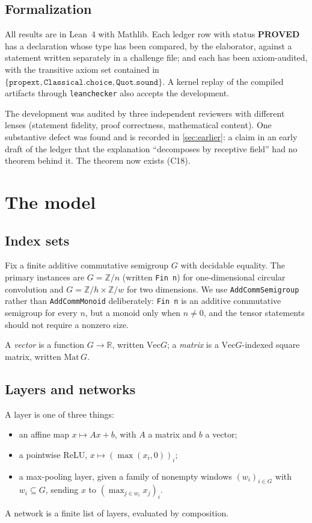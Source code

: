 \documentclass[11pt]{article}
\newcommand{\Lean}{Lean}
\newcommand{\code}[1]{\texttt{#1}}
\newcommand{\claim}[1]{\textbf{#1}}
\newcommand{\RR}{\mathbb{R}}
\newcommand{\VecG}{\mathrm{Vec}}
\begin{document}
\subsection{Formalization}

All results are in \Lean{}~4 with Mathlib. Each ledger row with status
\claim{PROVED} has a declaration whose type has been compared, by the
elaborator, against a statement written separately in a challenge file; and
each has been axiom-audited, with the transitive axiom set contained in
$\{\code{propext}, \code{Classical.choice}, \code{Quot.sound}\}$. A kernel
replay of the compiled artifacts through \code{leanchecker} also accepts the
development.

The development was audited by three independent reviewers with different
lenses (statement fidelity, proof correctness, mathematical content). One
substantive defect was found and is recorded in \cref{sec:earlier}: a claim in
an early draft of the ledger that the explanation ``decomposes by receptive
field'' had no theorem behind it. The theorem now exists (C18).

\section{The model}

\subsection{Index sets}

Fix a finite additive commutative semigroup $G$ with decidable equality. The
primary instances are $G = \mathbb{Z}/n$ (written \code{Fin n}) for
one-dimensional circular convolution and $G = \mathbb{Z}/h \times \mathbb{Z}/w$
for two dimensions. We use \code{AddCommSemigroup} rather than
\code{AddCommMonoid} deliberately: \code{Fin n} is an additive commutative
semigroup for every $n$, but a monoid only when $n \ne 0$, and the tensor
statements should not require a nonzero size.

A \emph{vector} is a function $G \to \RR$, written $\VecG G$; a \emph{matrix} is
a $\VecG G$-indexed square matrix, written $\mathrm{Mat}\,G$.

\subsection{Layers and networks}

A layer is one of three things:
\begin{itemize}
\item an affine map $x \mapsto Ax + b$, with $A$ a matrix and $b$ a vector;
\item a pointwise ReLU, $x \mapsto (\max(x_i, 0))_i$;
\item a max-pooling layer, given a family of nonempty windows
  $(w_i)_{i \in G}$ with $w_i \subseteq G$, sending $x$ to
  $({\max_{j \in w_i} x_j})_i$.
\end{itemize}
A network is a finite list of layers, evaluated by composition.
\end{document}
